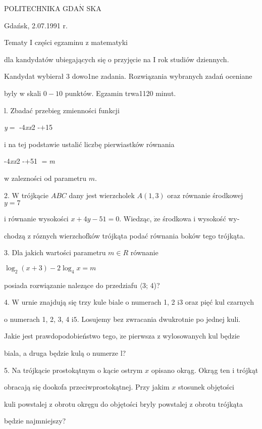 \documentclass[a4paper,12pt]{article}
\begin{document}
POLITECHNIKA $\mathrm{G}\mathrm{D}\mathrm{A}\acute{\mathrm{N}}$ SKA

Gdańsk, 2.07.1991 r.

Tematy I części egzaminu z matematyki

dla kandydatów ubiegających się o przyjęcie na I rok studiów dziennych.

Kandydat wybierał 3 dowo1ne zadania. Rozwiązania wybranych zadań oceniane

byly w skali $0-10$ punktów. Egzamin trwa1120 minut.

l. Zbadać przebieg zmienności funkcji

{\it y}$=$ -4{\it xx}2 -$+$15

i na tej podstawie ustalić liczbę pierwiastków równania

-4{\it xx}2 -$+$51 $=${\it m}

w zalezności od parametru $m.$

2. $\mathrm{W}$ trójkącie $ABC$ dany jest wierzcholek $A(1,3)$ oraz równanie środkowej $y=7$

i równanie wysokości $x+4y-51=0$. Wiedząc, $\dot{\mathrm{z}}\mathrm{e}$ środkowa i wysokość wy-

chodzą z róznych wierzchofków trójkąta podać równania boków tego trójkąta.

3. Dla jakich wartości parametru $m\in R$ równanie

$\log_{2}(x+3)-2\log_{4}x=m$

posiada rozwiązanie nalezące do przedziafu $\langle$3; 4)?

4. $\mathrm{W}$ urnie znajdują się trzy kule biale o numerach 1, 2 $\mathrm{i}3$ oraz pięć kul czarnych

o numerach 1, 2, 3, 4 $\mathrm{i}5$. Losujemy bez zwracania dwukrotnie po jednej kuli.

Jakie jest prawdopodobieństwo tego, $\dot{\mathrm{z}}\mathrm{e}$ pierwsza z wylosowanych kul będzie

biala, a druga będzie kulą o numerze l?

5. Na trójkącie prostokątnym o kącie ostrym $x$ opisano okrąg. Okrąg ten i trójkąt

obracają się dookofa przeciwprostokątnej. Przy jakim $x$ stosunek objętości

kuli powstalej z obrotu okręgu do objętości bryly powstalej z obrotu trójkąta

będzie najmniejszy?
\end{document}
